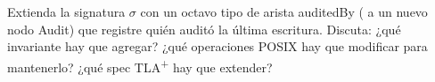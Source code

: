 \begin{ejercicio}[\dificultad{$\star\star\star$}]
\label{ej:tg-9}
Extienda la signatura $\sigma$ con un octavo tipo de arista
\textsf{auditedBy} (\NInode{} a un nuevo nodo \textsf{Audit}) que registre
quién auditó la última escritura. Discuta: ¿qué invariante hay que
agregar? ¿qué operaciones POSIX hay que modificar para mantenerlo? ¿qué
spec TLA\textsuperscript{+} hay que extender?
\end{ejercicio}
